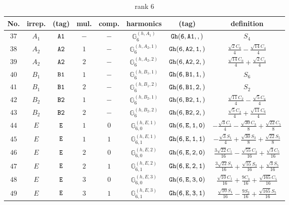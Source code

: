 \documentclass[fleqn,8pt]{jsarticle}
\begin{document}
\begin{table}[ht!]
\begin{center}
\caption{rank 6}
\renewcommand{\arraystretch}{1.3}
\begin{tabular}{cccccccc} \hline \hline
No. & irrep. & (tag) & mul. & comp. & harmonics & (tag) & definition \\ \hline
$ 37 $ & $ A_{1} $ & $ {\tt A1} $ & $ - $ & $ - $ & $ \mathbb{G}_{6}^{(h,A_{1})} $ & $ {\tt Gh(6,A1,,)} $ & $ S_{4} $ \\
$ 38 $ & $ A_{2} $ & $ {\tt A2} $ & $ 1 $ & $ - $ & $ \mathbb{G}_{6}^{(h,A_{2},1)} $ & $ {\tt Gh(6,A2,1,)} $ & $ \frac{\sqrt{2} C_{0}}{4} - \frac{\sqrt{14} C_{4}}{4} $ \\
$ 39 $ & $ A_{2} $ & $ {\tt A2} $ & $ 2 $ & $ - $ & $ \mathbb{G}_{6}^{(h,A_{2},2)} $ & $ {\tt Gh(6,A2,2,)} $ & $ \frac{\sqrt{14} C_{0}}{4} + \frac{\sqrt{2} C_{4}}{4} $ \\
$ 40 $ & $ B_{1} $ & $ {\tt B1} $ & $ 1 $ & $ - $ & $ \mathbb{G}_{6}^{(h,B_{1},1)} $ & $ {\tt Gh(6,B1,1,)} $ & $ S_{6} $ \\
$ 41 $ & $ B_{1} $ & $ {\tt B1} $ & $ 2 $ & $ - $ & $ \mathbb{G}_{6}^{(h,B_{1},2)} $ & $ {\tt Gh(6,B1,2,)} $ & $ S_{2} $ \\
$ 42 $ & $ B_{2} $ & $ {\tt B2} $ & $ 1 $ & $ - $ & $ \mathbb{G}_{6}^{(h,B_{2},1)} $ & $ {\tt Gh(6,B2,1,)} $ & $ \frac{\sqrt{11} C_{2}}{4} - \frac{\sqrt{5} C_{6}}{4} $ \\
$ 43 $ & $ B_{2} $ & $ {\tt B2} $ & $ 2 $ & $ - $ & $ \mathbb{G}_{6}^{(h,B_{2},2)} $ & $ {\tt Gh(6,B2,2,)} $ & $ \frac{\sqrt{5} C_{2}}{4} + \frac{\sqrt{11} C_{6}}{4} $ \\
$ 44 $ & $ E $ & $ {\tt E} $ & $ 1 $ & $ 0 $ & $ \mathbb{G}_{6,0}^{(h,E,1)} $ & $ {\tt Gh(6,E,1,0)} $ & $ - \frac{\sqrt{3} C_{1}}{4} - \frac{\sqrt{30} C_{3}}{8} + \frac{\sqrt{22} C_{5}}{8} $ \\
$ 45 $ & $ E $ & $ {\tt E} $ & $ 1 $ & $ 1 $ & $ \mathbb{G}_{6,1}^{(h,E,1)} $ & $ {\tt Gh(6,E,1,1)} $ & $ - \frac{\sqrt{3} S_{1}}{4} + \frac{\sqrt{30} S_{3}}{8} + \frac{\sqrt{22} S_{5}}{8} $ \\
$ 46 $ & $ E $ & $ {\tt E} $ & $ 2 $ & $ 0 $ & $ \mathbb{G}_{6,0}^{(h,E,2)} $ & $ {\tt Gh(6,E,2,0)} $ & $ \frac{3 \sqrt{22} C_{1}}{16} - \frac{\sqrt{55} C_{3}}{16} + \frac{\sqrt{3} C_{5}}{16} $ \\
$ 47 $ & $ E $ & $ {\tt E} $ & $ 2 $ & $ 1 $ & $ \mathbb{G}_{6,1}^{(h,E,2)} $ & $ {\tt Gh(6,E,2,1)} $ & $ \frac{3 \sqrt{22} S_{1}}{16} + \frac{\sqrt{55} S_{3}}{16} + \frac{\sqrt{3} S_{5}}{16} $ \\
$ 48 $ & $ E $ & $ {\tt E} $ & $ 3 $ & $ 0 $ & $ \mathbb{G}_{6,0}^{(h,E,3)} $ & $ {\tt Gh(6,E,3,0)} $ & $ \frac{\sqrt{10} C_{1}}{16} + \frac{9 C_{3}}{16} + \frac{\sqrt{165} C_{5}}{16} $ \\
$ 49 $ & $ E $ & $ {\tt E} $ & $ 3 $ & $ 1 $ & $ \mathbb{G}_{6,1}^{(h,E,3)} $ & $ {\tt Gh(6,E,3,1)} $ & $ \frac{\sqrt{10} S_{1}}{16} - \frac{9 S_{3}}{16} + \frac{\sqrt{165} S_{5}}{16} $ \\
 \hline \hline
\end{tabular}
\end{center}
\end{table}
\end{document}
